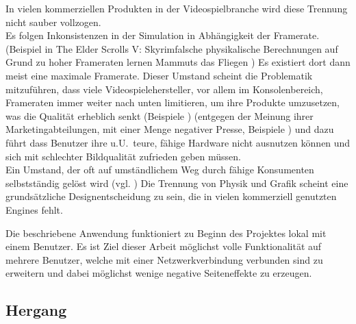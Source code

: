 In vielen kommerziellen Produkten in der Videospielbranche wird diese Trennung nicht sauber vollzogen.\\
Es folgen Inkonsistenzen in der Simulation in Abhängigkeit der Framerate.
(Beispiel in \glqq The Elder Scrolls V: Skyrim\grqq falsche physikalische Berechnungen auf Grund zu hoher Frameraten lernen Mammuts das Fliegen \cite{flying-fucking-mammoths})
Es existiert dort dann meist eine maximale Framerate.
Dieser Umstand scheint die Problematik mitzuführen, dass viele Videospielehersteller, vor allem im Konsolenbereich, Frameraten immer weiter nach unten limitieren, um ihre Produkte umzusetzen, was die Qualität erheblich senkt (Beispiele \cites{skyrim-physics-cap-and-fix, dark_souls-physics-cap-and-fix})
(entgegen der Meinung ihrer Marketingabteilungen, mit einer Menge negativer Presse, Beispiele \cites{morecinematic00, morecinematic01}
) und dazu führt dass Benutzer ihre u.U.~teure, fähige Hardware nicht ausnutzen können und sich mit schlechter Bildqualität zufrieden geben müssen.\\
Ein Umstand, der oft auf umständlichem Weg durch fähige Konsumenten selbstständig gelöst wird (vgl. \cites{skyrim-physics-cap-and-fix, dark_souls-physics-cap-and-fix})
Die Trennung von Physik und Grafik scheint eine grundsätzliche Designentscheidung zu sein, die in vielen kommerziell genutzten Engines fehlt.

Die beschriebene Anwendung funktioniert zu Beginn des Projektes lokal mit einem Benutzer. Es ist Ziel dieser Arbeit möglichst volle Funktionalität auf mehrere Benutzer, welche mit einer Netzwerkverbindung verbunden sind zu erweitern und dabei möglichst wenige negative Seiteneffekte zu erzeugen.

\subsection{Hergang}

